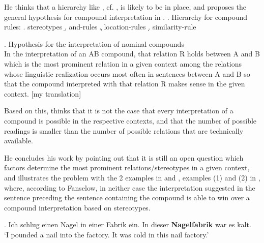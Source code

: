 He thinks that a hierarchy like \Next, cf. \citet[215]{Fanselow:1981},  is likely to be in place, and proposes
the general hypothesis for compound interpretation in \NNext.
\ex. Hierarchy for compound rules:
\a. stereotypes
\b. and-rules
\c. location-rules
\d. similarity-rule

\ex. \label{ex:hypothesis_of_compound_composition_second_version}
  Hypothesis for the interpretation of nominal compounds\\
  In the interpretation of an AB compound, that relation R holds between A
  and B which is the most prominent relation in a given context among the relations whose
  linguistic realization occurs most often in sentences between A and
  B so that the compound interpreted with that relation R makes sense
  in the given context. [my translation] \citet[215]{Fanselow:1981}\footnotemark




Based on this, \citet[215--216]{Fanselow:1981} thinks that it is not the case that every interpretation of a compound is
    possible in the respective contexts, and that the number of possible readings is smaller than
    the number of possible relations that are technically available.

He concludes his work by pointing out that it is still an open question which factors determine the most
  prominent relations/stereotypes in a given context, and illustrates the
  problem with the 2 examples in \Next and \NNext, examples (1) and
  (2) in \citet[221]{Fanselow:1981}, where, according to Fanselow, in
  neither case the interpretation suggested in the sentence preceding
  the sentence containing the compound is able to win over a compound interpretation based on
  stereotypes.

\ex. Ich schlug einen Nagel in einer Fabrik ein. In dieser \textbf{Nagelfabrik} war es kalt.\\
`I pounded a nail into the factory. It was cold in this nail factory.'


